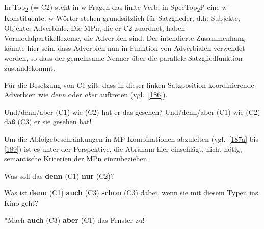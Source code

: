 In Top{\textsubscript{2}} (= C2) steht in w-Fragen  das finite Verb, in {SpecTop}\textsubscript{2}P eine w-Konstitu\-ente. w-Wörter stehen grundsätzlich für Satzglieder, d.h. Subjekte, Objekte, Adverbiale. Die MPn, die er C2 zuordnet, haben Vormodalpartikellexeme, die Adverbien  sind. Der intendierte Zusammenhang könnte hier sein, dass Adverbien nun in Funktion von Adverbialen verwendet werden, so dass der gemeinsame Nenner über die parallele Satzgliedfunktion zustandekommt. 

Für die Besetzung von C1 gilt, dass in dieser linken Satzposition koordinierende Adverbien wie \textit{denn} oder \textit{aber} auftreten (vgl.\ \ref{186}).\pagebreak

\begin{exe}
	\ex\label{186} 
		\begin{xlist}	
			\ex\label{186a} Und/denn/aber (C1) wie (C2) hat er das gesehen?
			\ex\label{186b} Und/denn/aber (C1) wie (C2) daß (C3) er sie gesehen hat!
		\end{xlist}
	\hfill\hbox{\citet[106]{Abraham1995}}	
\end{exe}
Um die Abfolgebeschränkungen in MP-Kom\-bi\-na\-ti\-on\-en abzuleiten (vgl.\ \ref{187a} bis \ref{189}) ist es unter der Perspektive, die Abraham hier einschlägt, nicht nötig, semantische Kriterien der MPn einzubeziehen. 

\begin{exe}
	\ex\label{187a} 
	Was soll das \textbf{denn} (C1) \textbf{nur} (C2)?
\end{exe}

\begin{exe}
	\ex\label{187} 
	Was ist \textbf{denn} (C1) \textbf{auch} (C3) \textbf{schon} (C3) dabei, wenn sie mit diesem Typen ins Kino geht?
\end{exe}

\begin{exe}
	\ex\label{189} 
	*Mach \textbf{auch} (C3) \textbf{aber} (C1) das Fenster zu!
	\hfill\hbox{\citet[286--287]{Thurmair1989}}
\end{exe}												    		   

